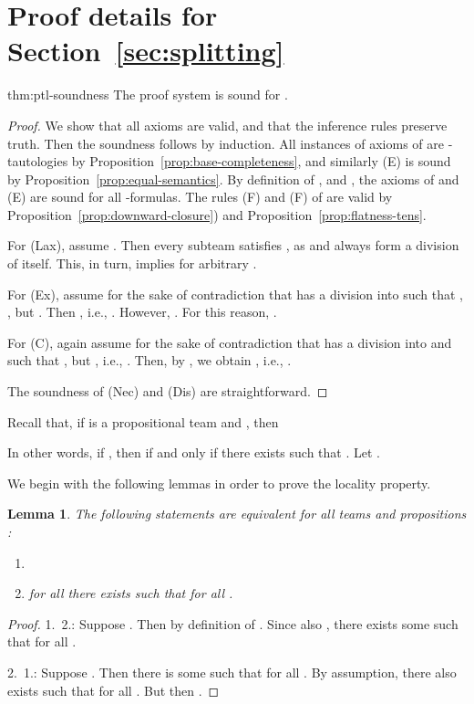 \documentclass[a4paper,english,fleqn,11pt,final]{scrartcl}
\makeatletter
\newcommand{\ie}{i.e.\@\xspace}
\newcommand{\Deriv}[1]{{\normalfont\textsf{#1}}}
\theoremstyle{plain}
\newtheorem{lemma}[theorem]{Lemma}
\theoremstyle{definition}
\makeatother
\begin{document}
\section{Proof details for Section~\ref{sec:splitting}}

\begin{reptheorem}{thm:ptl-soundness}
The proof system  is sound for .
\end{reptheorem}
\begin{proof}\label{p:soundproof}
We show that all axioms are valid, and that the inference rules preserve truth.
Then the soundness follows by induction.
All instances of axioms of  are -tautologies by Proposition~\ref{prop:base-completeness}, and similarly \Deriv{(E)} is sound by Proposition~\ref{prop:equal-semantics}.
By definition of ,  and , the axioms of  and \Deriv{(E)} are sound for all -formulas.
The rules \Deriv{(F)} and \Deriv{(F)} of  are valid by Proposition~\ref{prop:downward-closure}) and Proposition~\ref{prop:flatness-tens}.

For \Deriv{(Lax)}, assume .
Then every subteam  satisfies , as  and  always form a division of  itself.
This, in turn, implies  for arbitrary .

For \Deriv{(Ex)}, assume for the sake of contradiction that  has a division into  such that , , but .
Then , \ie, .
However, .
For this reason, .

For \Deriv{(C)}, again assume for the sake of contradiction that  has a division into  and  such that , but , \ie, .
Then, by , we obtain , \ie, .

The soundness of \Deriv{(Nec)} and \Deriv{(Dis)} are straightforward.
\end{proof}



Recall that, if  is a propositional team and , then

In other words, if , then  if and only if there exists  such that .
Let .

We begin with the following lemmas in order to prove the locality property.

\begin{lemma}\label{lem:rel-equality}
The following statements are equivalent for all teams  and propositions :
\begin{enumerate}
\item 
\item for all  there exists  such that  for all .
\end{enumerate}
\end{lemma}
\begin{proof}
1.\  2.:
Suppose .
Then  by definition of .
Since also , there exists some  such that  for all .

2.\  1.:
Suppose .
Then there is some  such that  for all .
By assumption, there also exists  such that  for all .
But then .
\end{proof}
\end{document}
